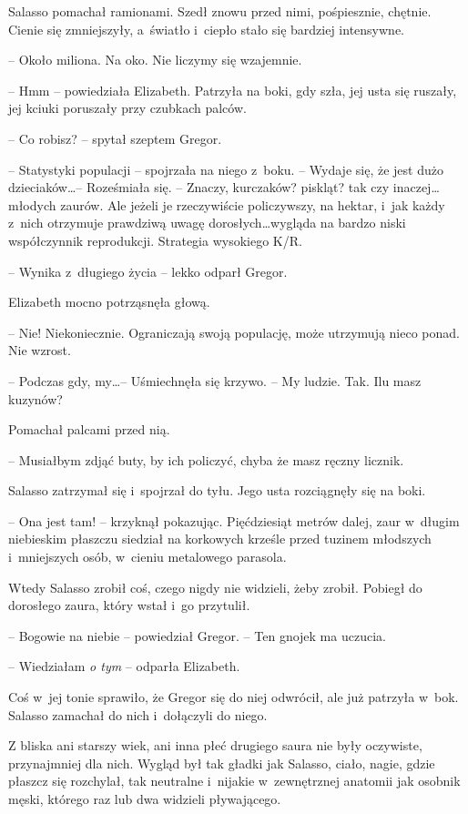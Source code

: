 \documentclass[oneside,polish,12pt,sfheadings]{mwbk}
\begin{document}
Salasso pomachał ramionami. Szedł znowu przed nimi, pośpiesznie,
chętnie. Cienie się zmniejszyły, a~światło i~ciepło stało się bardziej
intensywne.

-- Około miliona. Na oko. Nie liczymy się wzajemnie.

-- Hmm -- powiedziała Elizabeth. Patrzyła na boki, gdy szła, jej usta się
ruszały, jej kciuki poruszały przy czubkach palców.

-- Co robisz? -- spytał szeptem Gregor.

-- Statystyki populacji -- spojrzała na niego z~boku. -- Wydaje się, że
jest dużo dzieciaków\ldots -- Roześmiała się. -- Znaczy, kurczaków? piskląt?
tak czy inaczej\ldots młodych zaurów. Ale jeżeli je rzeczywiście
policzywszy, na hektar, i~jak każdy z~nich otrzymuje prawdziwą uwagę
dorosłych\ldots wygląda na bardzo niski współczynnik reprodukcji. Strategia
wysokiego K/R.

-- Wynika z~długiego życia -- lekko odparł Gregor.

Elizabeth mocno potrząsnęła głową. 

-- Nie! Niekoniecznie. Ograniczają
swoją populację, może utrzymują nieco ponad. Nie wzrost.

-- Podczas gdy, my\ldots -- Uśmiechnęła się krzywo. -- My ludzie. Tak. Ilu masz kuzynów?

Pomachał palcami przed nią. 

-- Musiałbym zdjąć buty, by ich policzyć,
chyba że masz ręczny licznik.

Salasso zatrzymał się i~spojrzał do tyłu. Jego usta rozciągnęły się na
boki.

-- Ona jest tam! -- krzyknął pokazując. Pięćdziesiąt metrów dalej, zaur w~długim niebieskim płaszczu siedział na korkowych krześle przed tuzinem
młodszych i~mniejszych osób, w~cieniu metalowego parasola.

Wtedy Salasso zrobił coś, czego nigdy nie widzieli, żeby zrobił. Pobiegł
do dorosłego zaura, który wstał i~go przytulił.

-- Bogowie na niebie -- powiedział Gregor. -- Ten gnojek ma uczucia.

-- Wiedziałam \emph{o tym} -- odparła Elizabeth.

Coś w~jej tonie sprawiło, że Gregor się do niej odwrócił, ale już
patrzyła w~bok. Salasso zamachał do nich i~dołączyli do niego.

Z bliska ani starszy wiek, ani inna płeć drugiego saura nie były
oczywiste, przynajmniej dla nich. Wygląd był tak gładki jak Salasso,
ciało, nagie, gdzie płaszcz się rozchylał, tak neutralne i~nijakie w~zewnętrznej anatomii jak osobnik męski, którego raz lub dwa widzieli
pływającego.
\end{document}

